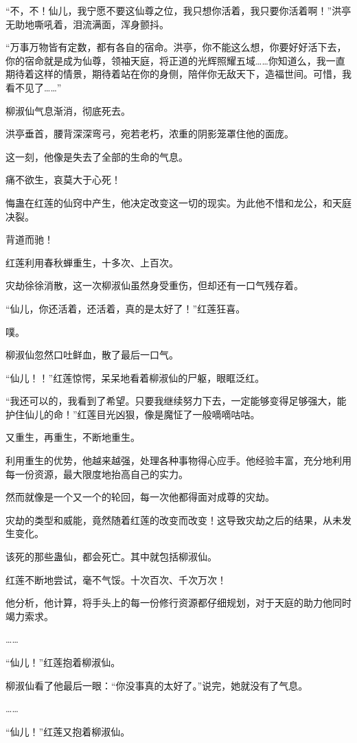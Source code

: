 \begin{this_body}
“不，不！仙儿，我宁愿不要这仙尊之位，我只想你活着，我只要你活着啊！”洪亭无助地嘶吼着，泪流满面，浑身颤抖。

“万事万物皆有定数，都有各自的宿命。洪亭，你不能这么想，你要好好活下去，你的宿命就是成为仙尊，领袖天庭，将正道的光辉照耀五域……你知道么，我一直期待着这样的情景，期待着站在你的身侧，陪伴你无敌天下，造福世间。可惜，我看不见了……”

柳淑仙气息渐消，彻底死去。

洪亭垂首，腰背深深弯弓，宛若老朽，浓重的阴影笼罩住他的面庞。

这一刻，他像是失去了全部的生命的气息。

痛不欲生，哀莫大于心死！

悔蛊在红莲的仙窍中产生，他决定改变这一切的现实。为此他不惜和龙公，和天庭决裂。

背道而驰！

红莲利用春秋蝉重生，十多次、上百次。

灾劫徐徐消散，这一次柳淑仙虽然身受重伤，但却还有一口气残存着。

“仙儿，你还活着，还活着，真的是太好了！”红莲狂喜。

噗。

柳淑仙忽然口吐鲜血，散了最后一口气。

“仙儿！！”红莲惊愕，呆呆地看着柳淑仙的尸躯，眼眶泛红。

“我还可以的，我看到了希望。只要我继续努力下去，一定能够变得足够强大，能护住仙儿的命！”红莲目光凶狠，像是魔怔了一般嘀嘀咕咕。

又重生，再重生，不断地重生。

利用重生的优势，他越来越强，处理各种事物得心应手。他经验丰富，充分地利用每一份资源，最大限度地抬高自己的实力。

然而就像是一个又一个的轮回，每一次他都得面对成尊的灾劫。

灾劫的类型和威能，竟然随着红莲的改变而改变！这导致灾劫之后的结果，从未发生变化。

该死的那些蛊仙，都会死亡。其中就包括柳淑仙。

红莲不断地尝试，毫不气馁。十次百次、千次万次！

他分析，他计算，将手头上的每一份修行资源都仔细规划，对于天庭的助力他同时竭力索求。

……

“仙儿！”红莲抱着柳淑仙。

柳淑仙看了他最后一眼：“你没事真的太好了。”说完，她就没有了气息。

……

“仙儿！”红莲又抱着柳淑仙。


\end{this_body}
